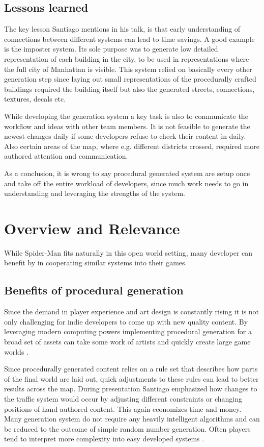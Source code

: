 \documentclass[a4paper]{article}
\begin{document}
\subsection{Lessons learned}

The key lesson Santiago mentions in his talk, is that early understanding of connections between different systems can lead to time savings. A good example is the imposter system. Its sole  purpose was to generate low detailed representation of each building in the city, to be used in representations where the full city of Manhattan is visible. This system relied on basically every other generation step since laying out small representations of the procedurally crafted buildings required the building itself but also the generated streets, connections, textures, decals etc.

While developing the generation system a key task is also to communicate the workflow and ideas with other team members. It is not feasible to generate the newest changes daily if some developers refuse to check their content in daily. Also certain areas of the map, where e.g. different districts crossed, required more authored attention and communication.

As a conclusion, it is wrong to say procedural generated system are setup once and take off the entire workload of developers, since much work needs to go in understanding and leveraging the strengths of the system. 

\section{Overview and Relevance}

While Spider-Man fits naturally in this open world setting, many developer can benefit by in cooperating similar systems into their games. 

\subsection{Benefits of procedural generation}
Since the demand in player experience and art design is constantly rising it is not only challenging for indie developers to come up with new quality content. By leveraging modern computing powers implementing procedural generation for a broad set of assets can take some work of artists and quickly create large game worlds \cite{green_2016}. 

Since procedurally generated content relies on a rule set that describes how parts of the final world are laid out, quick adjustments to these rules can lead to better results across the map. During presentation Santiago emphasized how changes to the traffic system would occur by adjusting different constraints or changing positions of hand-authored content. This again economizes time and money. Many generation system do not require any heavily intelligent algorithms and can be reduced to the outcome of simple random number generation. Often players tend to interpret more complexity into easy developed systems \cite{short2019}.
\end{document}
